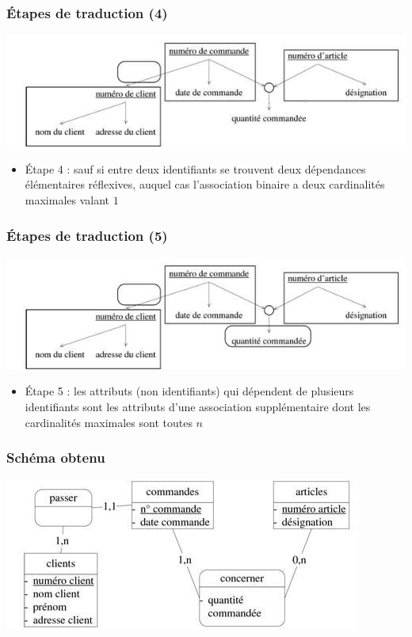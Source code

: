 \begin{frame}
  \frametitle{Étapes de traduction (4)}
  \begin{center}
    \includegraphics[width=0.9\linewidth]{graphe_identifie_3.jpg}
  \end{center}
  \begin{itemize}
    \item Étape 4 : sauf si entre deux identifiants se trouvent deux dépendances élémentaires réflexives,
      auquel cas l'association binaire a deux cardinalités maximales valant $1$
  \end{itemize}
\end{frame}

\begin{frame}
  \frametitle{Étapes de traduction (5)}
  \begin{center}
    \includegraphics[width=0.9\linewidth]{graphe_identifie_5.jpg}
  \end{center}
  \begin{itemize}
    \item Étape 5 : les attributs (non identifiants) qui dépendent de plusieurs identifiants sont les
      attributs d'une association supplémentaire dont les cardinalités maximales sont toutes $n$
  \end{itemize}
\end{frame}

\begin{frame}
  \frametitle{Schéma obtenu}
  \begin{center}
    \includegraphics[width=0.9\linewidth]{schema_traduit.jpg}
  \end{center}
\end{frame}

